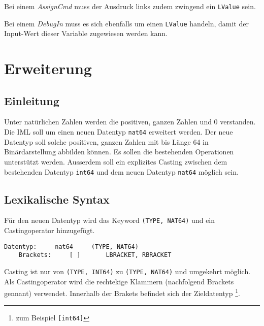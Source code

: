 \documentclass[10pt, a4paper, twocolumn]{article} %
\begin{document}
Bei einem \textit{AssignCmd} muss der Ausdruck links zudem zwingend ein \texttt{LValue} sein.

Bei einem \textit{DebugIn} muss es sich ebenfalls um einen \texttt{LValue} handeln, damit der Input-Wert dieser Variable zugewiesen werden kann.

\section{Erweiterung}
\subsection{Einleitung}
Unter natürlichen Zahlen werden die positiven, ganzen Zahlen und 0 verstanden.
Die IML soll um einen neuen Datentyp \texttt{nat64} erweitert werden.
Der neue Datentyp soll solche positiven, ganzen Zahlen mit bis Länge 64 in Binärdarstellung abbilden können.
Es sollen die bestehenden Operationen unterstützt werden.
Ausserdem soll ein explizites Casting zwischen dem bestehenden Datentyp \texttt{int64} und dem neuen Datentyp \texttt{nat64} möglich sein.

\subsection{Lexikalische Syntax}
Für den neuen Datentyp wird das Keyword \texttt{(TYPE, NAT64)} und ein Castingoperator hinzugefügt.

\begin{lstlisting}[backgroundcolor = \color{lightgray},
xleftmargin = 0.05cm,
framexleftmargin = 0.05em]
    Datentyp:     nat64     (TYPE, NAT64)
    Brackets:     [ ]       LBRACKET, RBRACKET
\end{lstlisting}

Casting ist nur von \texttt{(TYPE, INT64)} zu \texttt{(TYPE, NAT64)} und umgekehrt möglich.
Als Castingoperator wird die rechtekige Klammern (nachfolgend Brackets gennant) verwendet.
Innerhalb der Brakets befindet sich der Zieldatentyp \footnote{zum Beispiel \texttt{[int64]}}.
\end{document}
